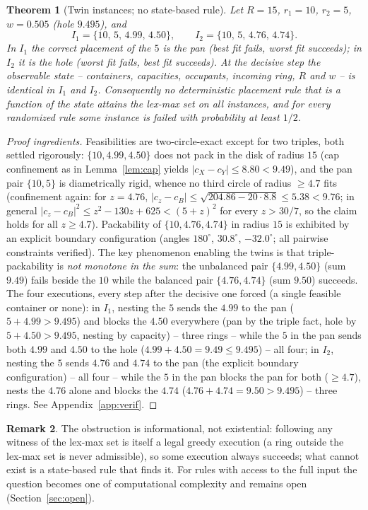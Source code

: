 \documentclass[11pt]{article}
\newtheorem{theorem}{Theorem}
\theoremstyle{definition}
\newtheorem{remark}[theorem]{Remark}
\begin{document}
\begin{theorem}[Twin instances; no state-based rule]\label{thm:twins}
Let $R=15$, $r_1=10$, $r_2=5$, $w=0.505$ (hole $9.495$), and
\[
I_1=\{10,\,5,\,4.99,\,4.50\},\qquad I_2=\{10,\,5,\,4.76,\,4.74\}.
\]
In $I_1$ the correct placement of the $5$ is the pan (best fit fails, worst
fit succeeds); in $I_2$ it is the hole (worst fit fails, best fit succeeds).
At the decisive step the observable state -- containers, capacities, occupants,
incoming ring, $R$ and $w$ -- is identical in $I_1$ and $I_2$. Consequently no
deterministic placement rule that is a function of the state attains the
lex-max set on all instances, and for every randomized rule some instance is
failed with probability at least $1/2$.
\end{theorem}
\begin{proof}[Proof ingredients]
Feasibilities are two-circle-exact except for two triples, both settled
rigorously: $\{10,4.99,4.50\}$ does not pack in the disk of radius $15$ (cap
confinement as in Lemma~\ref{lem:cap} yields $|c_X-c_Y|\le8.80<9.49$), and the
pan pair $\{10,5\}$ is diametrically rigid, whence no third circle of radius
$\ge4.7$ fits (confinement again: for $z=4.76$,
$|c_z-c_B|\le\sqrt{204.86-20\cdot8.8}\le5.38<9.76$; in general
$|c_z-c_B|^2\le z^2-130z+625<(5+z)^2$ for every $z>30/7$, so the claim holds
for all $z\ge4.7$). Packability of
$\{10,4.76,4.74\}$ in radius $15$ is exhibited by an explicit boundary
configuration (angles $180^\circ$, $30.8^\circ$, $-32.0^\circ$; all pairwise
constraints verified). The key phenomenon enabling the twins is that
triple-packability is \emph{not monotone in the sum}: the unbalanced pair
$\{4.99,4.50\}$ (sum $9.49$) fails beside the $10$ while the balanced pair
$\{4.76,4.74\}$ (sum $9.50$) succeeds.
The four executions, every step after the decisive one forced (a single
feasible container or none): in $I_1$, nesting the $5$ sends the $4.99$ to the
pan ($5+4.99>9.495$) and blocks the $4.50$ everywhere (pan by the triple
fact, hole by $5+4.50>9.495$, nesting by capacity) -- three rings -- while
the $5$ in the pan sends both $4.99$ and $4.50$ to the hole
($4.99+4.50=9.49\le9.495$) -- all four; in $I_2$, nesting the $5$ sends
$4.76$ and $4.74$ to the pan (the explicit boundary configuration) -- all
four -- while the $5$ in the pan blocks the pan for both ($\ge4.7$), nests
the $4.76$ alone and blocks the $4.74$ ($4.76+4.74=9.50>9.495$) -- three
rings. See Appendix~\ref{app:verif}.
\end{proof}

\begin{remark}
The obstruction is informational, not existential: following any witness of
the lex-max set is itself a legal greedy execution (a ring outside the lex-max
set is never admissible), so some execution always succeeds; what cannot exist
is a state-based rule that finds it. For rules with access to the full input
the question becomes one of computational complexity and remains open
(Section~\ref{sec:open}).
\end{remark}
\end{document}
